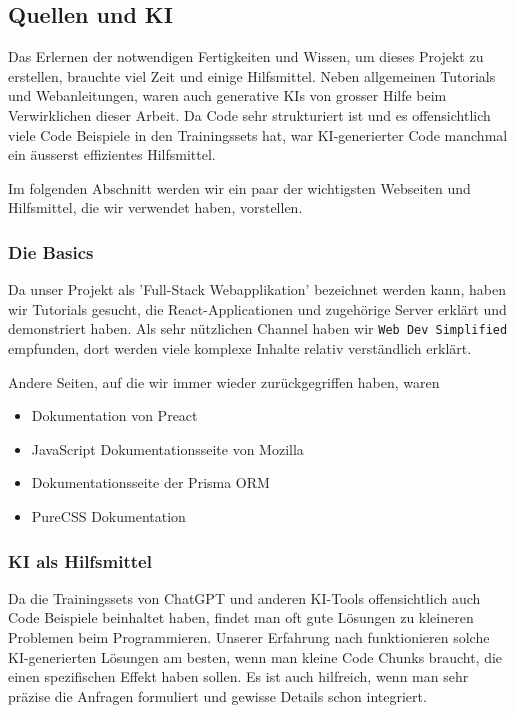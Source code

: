 \subsection{Quellen und KI}

Das Erlernen der notwendigen Fertigkeiten und Wissen, um dieses Projekt zu erstellen, brauchte viel Zeit und einige Hilfsmittel. Neben allgemeinen Tutorials und Webanleitungen, waren auch generative KIs von grosser Hilfe beim Verwirklichen dieser Arbeit. Da Code sehr strukturiert ist und es offensichtlich viele Code Beispiele in den Trainingssets hat, war KI-generierter Code manchmal ein äusserst effizientes Hilfsmittel.

Im folgenden Abschnitt werden wir ein paar der wichtigsten Webseiten und Hilfsmittel, die wir verwendet haben, vorstellen.

\subsubsection{Die Basics} 
Da unser Projekt als 'Full-Stack Webapplikation' bezeichnet werden kann, haben wir Tutorials gesucht, die React-Applicationen und zugehörige Server erklärt und demonstriert haben. Als sehr nützlichen Channel haben wir \texttt{Web Dev Simplified} \cite{site:webdev} empfunden, dort werden viele komplexe Inhalte relativ verständlich erklärt.

Andere Seiten, auf die wir immer wieder zurückgegriffen haben, waren 
\begin{itemize}
    \item Dokumentation von Preact\cite{site:preact}
    \item JavaScript Dokumentationsseite von Mozilla\cite{site:js}
    \item Dokumentationsseite der Prisma ORM\cite{site:prisma}
    \item PureCSS Dokumentation\cite{site:pure}
\end{itemize}

\subsubsection{KI als Hilfsmittel}
Da die Trainingssets von ChatGPT und anderen KI-Tools offensichtlich auch Code Beispiele beinhaltet haben, findet man oft gute Lösungen zu kleineren Problemen beim Programmieren. Unserer Erfahrung nach funktionieren solche KI-generierten Lösungen am besten, wenn man kleine Code Chunks braucht, die einen spezifischen Effekt haben sollen. Es ist auch hilfreich, wenn man sehr präzise die Anfragen formuliert und gewisse Details schon integriert.

